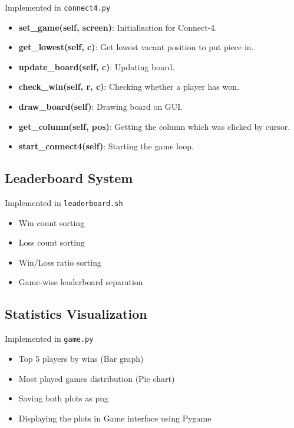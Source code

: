 \documentclass[12pt,a4paper]{article}
\begin{document}
Implemented in \texttt{connect4.py}

\begin{itemize}
    \item \textbf{set\_game(self, screen)}: Initialisation for Connect-4.
    \item \textbf{get\_lowest(self, c)}: Get lowest vacant position to put piece in.
    \item \textbf{update\_board(self, c)}: Updating board.
    \item \textbf{check\_win(self, r, c)}: Checking whether a player has won.
    \item \textbf{draw\_board(self)}: Drawing board on GUI.
    \item \textbf{get\_column(self, pos)}: Getting the column which was clicked by cursor.
    \item \textbf{start\_connect4(self)}: Starting the game loop.
    \end{itemize}

\subsection{Leaderboard System}

Implemented in \texttt{leaderboard.sh}

\begin{itemize}
    \item Win count sorting
    \item Loss count sorting
    \item Win/Loss ratio sorting
    \item Game-wise leaderboard separation
\end{itemize}

\subsection{Statistics Visualization}

Implemented in \texttt{game.py}

\begin{itemize}
    \item Top 5 players by wins (Bar graph)
    \item Most played games distribution (Pie chart)
    \item Saving both plots as png
    \item Displaying the plots in Game interface using Pygame
\end{itemize}

\end{document}
